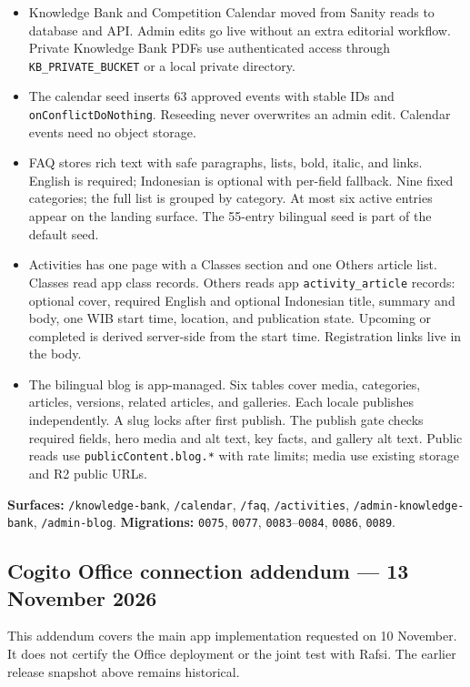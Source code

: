 \documentclass[11pt,a4paper]{article}
\newcommand{\code}[1]{\texttt{#1}}
\begin{document}
\begin{itemize}
	\item Knowledge Bank and Competition Calendar moved from Sanity reads to database and API. Admin edits go live without an extra editorial workflow. Private Knowledge Bank PDFs use authenticated access through \code{KB\_PRIVATE\_BUCKET} or a local private directory.
	\item The calendar seed inserts 63 approved events with stable IDs and \code{onConflictDoNothing}. Reseeding never overwrites an admin edit. Calendar events need no object storage.
	\item FAQ stores rich text with safe paragraphs, lists, bold, italic, and links. English is required; Indonesian is optional with per-field fallback. Nine fixed categories; the full list is grouped by category. At most six active entries appear on the landing surface. The 55-entry bilingual seed is part of the default seed.
	\item Activities has one page with a Classes section and one Others article list. Classes read app class records. Others reads app \code{activity\_article} records: optional cover, required English and optional Indonesian title, summary and body, one WIB start time, location, and publication state. Upcoming or completed is derived server-side from the start time. Registration links live in the body.
	\item The bilingual blog is app-managed. Six tables cover media, categories, articles, versions, related articles, and galleries. Each locale publishes independently. A slug locks after first publish. The publish gate checks required fields, hero media and alt text, key facts, and gallery alt text. Public reads use \code{publicContent.blog.*} with rate limits; media use existing storage and R2 public URLs.
\end{itemize}

\noindent\textbf{Surfaces:} \code{/knowledge-bank}, \code{/calendar}, \code{/faq}, \code{/activities}, \code{/admin-knowledge-bank}, \code{/admin-blog}. \textbf{Migrations:} \code{0075}, \code{0077}, \code{0083}--\code{0084}, \code{0086}, \code{0089}.

\subsection{Cogito Office connection addendum --- 13 November 2026}

This addendum covers the main app implementation requested on 10 November. It does not certify the Office deployment or the joint test with Rafsi. The earlier release snapshot above remains historical.
\end{document}

